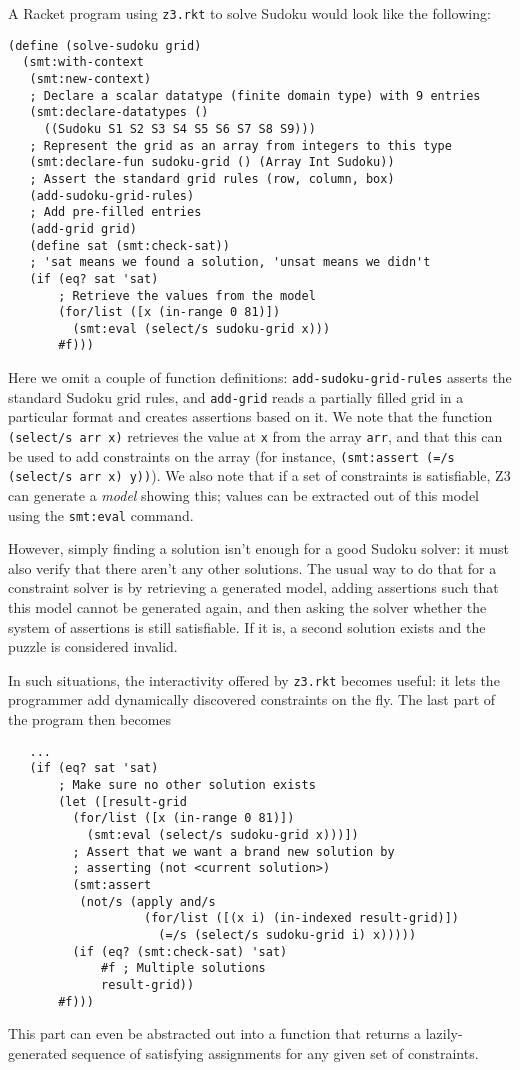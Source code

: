 A Racket program using \texttt{z3.rkt} to solve Sudoku would look like the
following:

\begin{verbatim}
(define (solve-sudoku grid)
  (smt:with-context
   (smt:new-context)
   ; Declare a scalar datatype (finite domain type) with 9 entries
   (smt:declare-datatypes ()
     ((Sudoku S1 S2 S3 S4 S5 S6 S7 S8 S9)))
   ; Represent the grid as an array from integers to this type
   (smt:declare-fun sudoku-grid () (Array Int Sudoku))
   ; Assert the standard grid rules (row, column, box)
   (add-sudoku-grid-rules)
   ; Add pre-filled entries
   (add-grid grid)
   (define sat (smt:check-sat))
   ; 'sat means we found a solution, 'unsat means we didn't
   (if (eq? sat 'sat)
       ; Retrieve the values from the model
       (for/list ([x (in-range 0 81)])
         (smt:eval (select/s sudoku-grid x)))
       #f)))
\end{verbatim}

Here we omit a couple of function definitions: \texttt{add-sudoku-grid-rules}
asserts the standard Sudoku grid rules, and \texttt{add-grid} reads a
partially filled grid in a particular format and creates assertions based on
it. We note that the function \texttt{(select/s arr x)} retrieves the value at
\texttt{x} from the array \texttt{arr}, and that this can be used to add
constraints on the array (for instance, \texttt{(smt:assert (=/s (select/s arr
x) y))}). We also note that if a set of constraints is satisfiable, Z3 can
generate a \textit{model} showing this; values can be extracted out of this
model using the \texttt{smt:eval} command.

However, simply finding a solution isn't enough for a good Sudoku solver: it
must also verify that there aren't any other solutions. The usual way to do
that for a constraint solver is by retrieving a generated model, adding
assertions such that this model cannot be generated again, and then asking the
solver whether the system of assertions is still satisfiable. If it is, a
second solution exists and the puzzle is considered invalid.

In such situations, the interactivity offered by \texttt{z3.rkt} becomes
useful: it lets the programmer add dynamically discovered constraints on the
fly. The last part of the program then becomes

\begin{verbatim}
   ...
   (if (eq? sat 'sat)
       ; Make sure no other solution exists
       (let ([result-grid
         (for/list ([x (in-range 0 81)])
           (smt:eval (select/s sudoku-grid x)))])
         ; Assert that we want a brand new solution by
         ; asserting (not <current solution>)
         (smt:assert
          (not/s (apply and/s
                   (for/list ([(x i) (in-indexed result-grid)])
                     (=/s (select/s sudoku-grid i) x)))))
         (if (eq? (smt:check-sat) 'sat)
             #f ; Multiple solutions
             result-grid))
       #f)))
\end{verbatim}

This part can even be abstracted out into a function that returns a lazily-
generated sequence of satisfying assignments for any given set of constraints.
